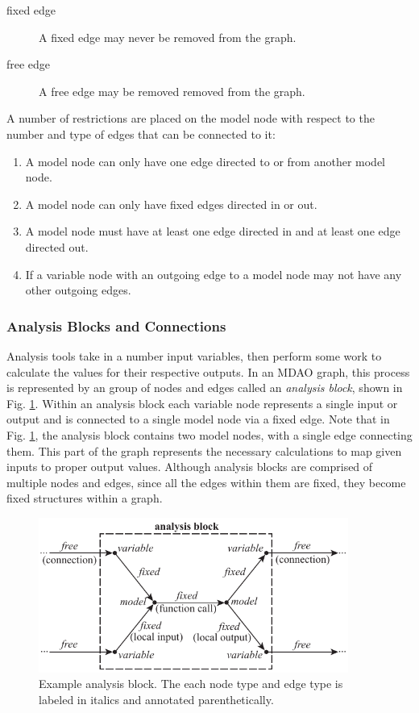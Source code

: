 \begin{description}
\item[fixed edge] A fixed edge may never be removed from the graph.
\item[free edge] A free edge may be removed removed from the graph.
\end{description}

A number of restrictions are placed on the model node with respect to the number and 
type of edges that can be connected to it: 
\begin{enumerate}
\item A model node can only have one edge directed to or from another model node.
\item A model node can only have fixed edges directed in or out.
\item A model node must have at least one edge directed in and at least one edge directed out.
\item If a variable node with an outgoing edge to a model node may not have any other outgoing edges.
\end{enumerate}

\subsubsection{Analysis Blocks and Connections}

Analysis tools take in a number input variables, then perform some work to calculate 
the values for their respective outputs. In an MDAO graph, this process is 
represented by an group of nodes and edges called an \emph{analysis block}, 
shown in Fig. \ref{f:analysis block}. Within an analysis block each variable 
node represents a single input or output and is connected 
to a single model node via a fixed edge. Note that in Fig. \ref{f:analysis block}, 
the analysis block contains two model nodes, with a single edge connecting them. 
This part of the graph represents the necessary calculations to map given inputs 
to proper output values. Although analysis blocks are comprised of multiple nodes and edges, since all 
the edges within them are fixed, they become fixed structures within a graph.

\begin{figure}[htb!]
    \begin{center}
    \includegraphics[width=4in]{images/analysis_block}
    \end{center}
    \vspace{-10pt}
\caption{Example analysis block. The each node type and edge type is labeled in italics and annotated parenthetically.}
\label{f:analysis block}
\end{figure}

